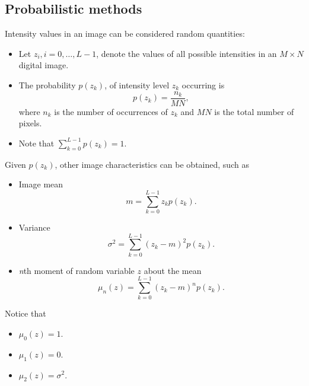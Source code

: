 
\subsection{Probabilistic methods}


\begin{frame}
Intensity values in an image can be considered random quantities:
\begin{itemize}
\item Let $z_{i}, i=0,\ldots,L-1$, denote the values of all possible intensities in an $M\times N$ digital image.
\item The probability $p(z_{k})$, of intensity level $z_{k}$ occurring is
\begin{equation}
p(z_{k}) = \dfrac{n_{k}}{MN},
\end{equation}
where $n_{k}$ is the number of occurrences of $z_{k}$ and $MN$ is the total number of pixels.
\item Note that $\sum_{k=0}^{L-1}p(z_{k}) = 1$.
\end{itemize}
\end{frame}


\begin{frame}
Given $p(z_{k})$, other image characteristics can be obtained, such as
\begin{itemize}
\item Image mean \[m=\sum_{k=0}^{L-1}z_{k}p(z_{k}).\]
\item Variance \[\sigma^{2}=\sum_{k=0}^{L-1}\left ( z_{k} - m \right )^{2} p(z_{k}).\]
\item \textit{n}th moment of random variable $z$ about the mean \[\mu_{n}(z) = \sum_{k=0}^{L-1}\left ( z_{k} - m \right )^{n} p(z_{k}).\]
\end{itemize}
\end{frame}


\begin{frame}
Notice that
\begin{itemize}
\item $\mu_{0}(z) = 1$.
\item $\mu_{1}(z) = 0$.
\item $\mu_{2}(z) = \sigma^{2}$.
\end{itemize}
\end{frame}


